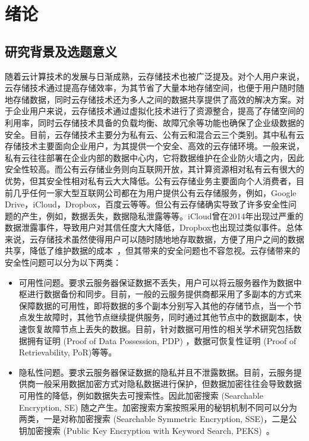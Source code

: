 \chapter{绪论}
\label{cha:intro}
\section{研究背景及选题意义}
随着云计算技术的发展与日渐成熟，云存储技术也被广泛提及。对个人用户来说，云存储技术通过提高存储效率，为其节省了大量本地存储空间，也便于用户随时随地存储数据，同时云存储技术还为多人之间的数据共享提供了高效的解决方案。对于企业用户来说，云存储技术通过虚拟化技术进行了资源整合，提高了存储空间的利用率，同时云存储技术具备的负载均衡、故障冗余等功能也确保了企业级数据的安全。目前，云存储技术主要分为私有云、公有云和混合云三个类别。其中私有云存储技术主要面向企业用户，为其提供一个安全、高效的云存储环境。一般来说，私有云往往部署在企业内部的数据中心内，它将数据维护在企业防火墙之内，因此安全性较高。而公有云存储业务则向互联网开放，其计算资源相对私有云有很大的优势，但其安全性相对私有云大大降低。公有云存储业务主要面向个人消费者，目前几乎任何一家大型互联网公司都在为用户提供公有云存储服务，例如，Google Drive，iCloud，Dropbox，百度云等等。但公有云存储确实导致了许多安全性问题的产生，例如，数据丢失，数据隐私泄露等等。iCloud曾在2014年出现过严重的数据泄露事件，导致用户对其信任度大大降低，Dropbox也出现过类似事件。总体来说，云存储技术虽然使得用户可以随时随地地存取数据，方便了用户之间的数据共享，降低了维护数据的成本~\cite{juels2007pors,ateniese2008scalable,kamara2011cs2,wang2011enabling,stefanov2012iris,kamara2013parallel,sun2015catch}，但其带来的安全问题也不容忽视。云存储带来的安全性问题可以分为以下两类：
\begin{itemize}
	\item 可用性问题。要求云服务器保证数据不丢失，用户可以将云服务器作为数据中枢进行数据备份和同步。目前，一般的云服务提供商都采用了多副本的方式来保障数据的可用性，即将数据的多个副本分别写入其他的存储节点，当一个节点发生故障时，其他节点继续提供服务，同时通过其他节点中的数据副本，快速恢复故障节点上丢失的数据。目前，针对数据可用性的相关学术研究包括数据拥有证明 (Proof of Data Possession, PDP)\cite{ateniese2007provable, ateniese2008scalable, erway2015dynamic,zhu2012cooperative} ，数据可恢复性证明 (Proof of Retrievability, PoR)\cite{juels2007pors, bowers2009proofs, stefanov2012iris}等等。
	\item 隐私性问题。要求云服务器保证数据的隐私并且不泄露数据。目前，云服务提供商一般采用数据加密方式对隐私数据进行保护，但数据加密往往会导致数据可用性的降低，例如数据失去可搜索性。因此加密搜索 (Searchable Encryption, SE) 随之产生。加密搜索方案按照采用的秘钥机制不同可以分为两类，一是对称加密搜索 (Searchable Symmetric Encryption, SSE)\cite{song2000practical,curtmola2011searchable,kamara2012dynamic,cash2014dynamic,wang2016searchable}，二是公钥加密搜索 (Public Key Encryption with Keyword Search, PEKS)~\cite{boneh2004public}。
\end{itemize}

